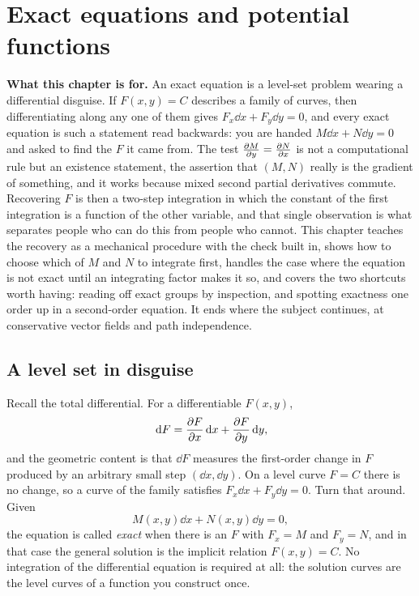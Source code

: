 \chapter{Exact equations and potential functions}

\begin{orient}
\textbf{What this chapter is for.} An exact equation is a level-set problem wearing a differential disguise. If $F(x,y)=C$ describes a family of curves, then differentiating along any one of them gives $F_x\dd x+F_y\dd y=0$, and every exact equation is such a statement read backwards: you are handed $M\dd x+N\dd y=0$ and asked to find the $F$ it came from. The test $\frac{\partial M}{\partial y}=\frac{\partial N}{\partial x}$ is not a computational rule but an existence statement, the assertion that $(M,N)$ really is the gradient of something, and it works because mixed second partial derivatives commute. Recovering $F$ is then a two-step integration in which the constant of the first integration is a function of the other variable, and that single observation is what separates people who can do this from people who cannot. This chapter teaches the recovery as a mechanical procedure with the check built in, shows how to choose which of $M$ and $N$ to integrate first, handles the case where the equation is not exact until an integrating factor makes it so, and covers the two shortcuts worth having: reading off exact groups by inspection, and spotting exactness one order up in a second-order equation. It ends where the subject continues, at conservative vector fields and path independence.
\end{orient}

\section{A level set in disguise}

Recall the total differential. For a differentiable $F(x,y)$,
\[\,\mathrm{d} F=\frac{\partial F}{\partial x}\,\mathrm{d} x+\frac{\partial F}{\partial y}\,\mathrm{d} y,\]
and the geometric content is that $\dd F$ measures the first-order change in $F$ produced by an arbitrary small step $(\dd x,\dd y)$. On a level curve $F=C$ there is no change, so a curve of the family satisfies $F_x\dd x+F_y\dd y=0$. Turn that around. Given
\[M(x,y)\dd x+N(x,y)\dd y=0,\]
the equation is called \emph{exact} when there is an $F$ with $F_x=M$ and $F_y=N$, and in that case the general solution is the implicit relation $F(x,y)=C$. No integration of the differential equation is required at all: the solution curves are the level curves of a function you construct once.


